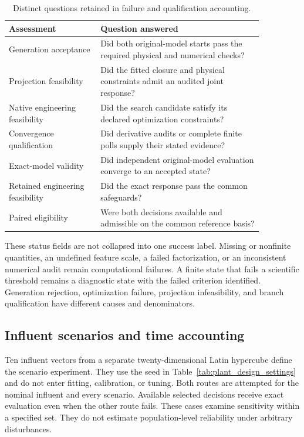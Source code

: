 \begin{table}[htbp]
\centering\small
\caption{Distinct questions retained in failure and qualification accounting.}
\label{tab:plant_failure_classes}
\begin{tabular}{p{0.31\linewidth}p{0.55\linewidth}}
\toprule Assessment & Question answered\\\midrule
Generation acceptance & Did both original-model starts pass the required physical and numerical checks?\\
Projection feasibility & Did the fitted closure and physical constraints admit an audited joint response?\\
Native engineering feasibility & Did the search candidate satisfy its declared optimization constraints?\\
Convergence qualification & Did derivative audits or complete finite polls supply their stated evidence?\\
Exact-model validity & Did independent original-model evaluation converge to an accepted state?\\
Retained engineering feasibility & Did the exact response pass the common safeguards?\\
Paired eligibility & Were both decisions available and admissible on the common reference basis?\\
\bottomrule
\end{tabular}
\end{table}

These status fields are not collapsed into one success label. Missing or nonfinite quantities, an undefined feature scale, a failed factorization, or an inconsistent numerical audit remain computational failures. A finite state that fails a scientific threshold remains a diagnostic state with the failed criterion identified. Generation rejection, optimization failure, projection infeasibility, and branch qualification have different causes and denominators.

\subsection{Influent scenarios and time accounting}

Ten influent vectors from a separate twenty-dimensional Latin hypercube define the scenario experiment. They use the seed in Table~\ref{tab:plant_design_settings} and do not enter fitting, calibration, or tuning. Both routes are attempted for the nominal influent and every scenario. Available selected decisions receive exact evaluation even when the other route fails. These cases examine sensitivity within a specified set. They do not estimate population-level reliability under arbitrary disturbances.

